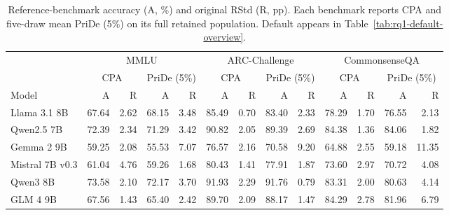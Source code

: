 \begin{table}[htbp]
\centering\footnotesize\setlength{\tabcolsep}{2.5pt}
\caption{Reference-benchmark accuracy (A, \%) and original RStd (R, pp). Each benchmark reports CPA and five-draw mean PriDe (5\%) on its full retained population. Default appears in Table~\ref{tab:rq1-default-overview}.}
\label{tab:results-reference-combined}
\begin{tabular}{l*{12}{r}}
\toprule
 & \multicolumn{4}{c}{MMLU} & \multicolumn{4}{c}{ARC-Challenge} & \multicolumn{4}{c}{CommonsenseQA}\\
\cmidrule(lr){2-5}\cmidrule(lr){6-9}\cmidrule(lr){10-13}
 & \multicolumn{2}{c}{CPA} & \multicolumn{2}{c}{PriDe (5\%)} & \multicolumn{2}{c}{CPA} & \multicolumn{2}{c}{PriDe (5\%)} & \multicolumn{2}{c}{CPA} & \multicolumn{2}{c}{PriDe (5\%)}\\
Model & A & R & A & R & A & R & A & R & A & R & A & R\\
\midrule
Llama 3.1 8B & 67.64 & 2.62 & 68.15 & 3.48 & 85.49 & 0.70 & 83.40 & 2.33 & 78.29 & 1.70 & 76.55 & 2.13\\
Qwen2.5 7B & 72.39 & 2.34 & 71.29 & 3.42 & 90.82 & 2.05 & 89.39 & 2.69 & 84.38 & 1.36 & 84.06 & 1.82\\
Gemma 2 9B & 59.25 & 2.08 & 55.53 & 7.07 & 76.57 & 2.16 & 70.58 & 9.20 & 64.88 & 2.55 & 59.18 & 11.35\\
Mistral 7B v0.3 & 61.04 & 4.76 & 59.26 & 1.68 & 80.43 & 1.41 & 77.91 & 1.87 & 73.60 & 2.97 & 70.72 & 4.08\\
Qwen3 8B & 73.58 & 2.10 & 72.17 & 3.70 & 91.93 & 2.29 & 91.76 & 0.79 & 83.31 & 2.00 & 80.63 & 4.14\\
GLM 4 9B & 67.56 & 1.43 & 65.40 & 2.42 & 89.70 & 2.09 & 88.17 & 1.47 & 84.29 & 2.78 & 81.96 & 6.79\\
\bottomrule
\end{tabular}
\end{table}
